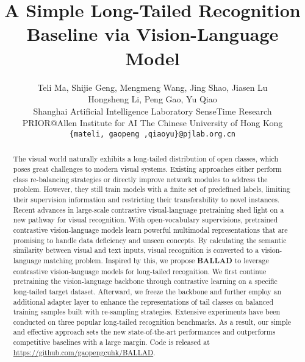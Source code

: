 \documentclass[10pt,twocolumn,letterpaper]{article}
\begin{document}
\title{A Simple Long-Tailed Recognition Baseline via Vision-Language Model}
\author{Teli Ma, Shijie Geng, Mengmeng Wang, Jing Shao, Jiasen Lu \\ Hongsheng Li,  Peng Gao, Yu Qiao\\ 
  Shanghai Artificial Intelligence Laboratory \quad 
  SenseTime Research \\
  PRIOR@Allen Institute for AI \quad
  The Chinese University of Hong Kong  \\
\texttt{\{mateli, gaopeng ,qiaoyu\}@pjlab.org.cn}
}

\maketitle





\begin{abstract}
The visual world naturally exhibits a long-tailed distribution of open classes, which poses great challenges to modern visual systems. Existing approaches either perform class re-balancing strategies or directly improve network modules to address the problem. However, they still train models with a finite set of predefined labels, limiting their supervision information and restricting their transferability to novel instances. Recent advances in large-scale contrastive visual-language pretraining shed light on a new pathway for visual recognition. With open-vocabulary supervisions, pretrained contrastive vision-language models learn powerful multimodal representations that are promising to handle data deficiency and unseen concepts. By calculating the semantic similarity between visual and text inputs, visual recognition is converted to a vision-language matching problem. Inspired by this, we propose \textbf{BALLAD} to leverage contrastive vision-language models for long-tailed recognition. We first continue pretraining the vision-language backbone through contrastive learning on a specific long-tailed target dataset. Afterward, we freeze the backbone and further employ an additional adapter layer to enhance the representations of tail classes on balanced training samples built with re-sampling strategies. Extensive experiments have been conducted on three popular long-tailed recognition benchmarks. As a result, our simple and effective approach sets the new state-of-the-art performances and outperforms competitive baselines with a large margin. Code is released at \url{https://github.com/gaopengcuhk/BALLAD}.
\end{abstract}
\end{document}
